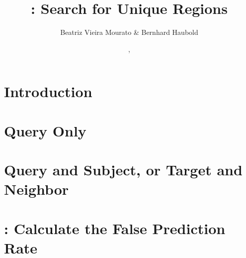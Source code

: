 \documentclass[a4paper]{report}
\begin{document}
\pagestyle{noweb}

\title{: Search for Unique Regions}
\author{Beatriz Vieira Mourato \& Bernhard Haubold}
\date{\!\!, }
\maketitle

\tableofcontents

\chapter{Introduction}

\chapter{Query Only}\label{ch:q}


\chapter{Query and Subject, or Target and Neighbor}\label{ch:qs}


\chapter{: Calculate the False Prediction Rate}



\end{document}
